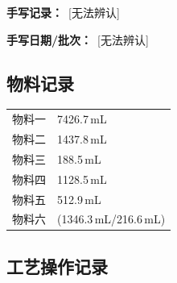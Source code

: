 \documentclass[UTF8,10pt,a4paper,fontset=fandol]{ctexart}
\newcommand{\fieldvalue}[1]{#1}
\newcommand{\handwritten}[1]{#1}
\begin{document}
\vspace{0.5em}

\noindent
\textbf{手写记录：}\ \handwritten{[无法辨认]}

\noindent
\textbf{手写日期/批次：}\ \handwritten{[无法辨认]}

\subsection{物料记录}

\begin{tabularx}{\textwidth}{@{}lX@{}}
物料一 &
\fieldvalue{7426.7\,mL} \\

物料二 &
\fieldvalue{1437.8\,mL} \\

物料三 &
\fieldvalue{188.5\,mL} \\

物料四 &
\fieldvalue{1128.5\,mL} \\

物料五 &
\fieldvalue{512.9\,mL} \\

物料六 &
\fieldvalue{(1346.3\,mL/216.6\,mL)}
\end{tabularx}

\subsection{工艺操作记录}
\end{document}
